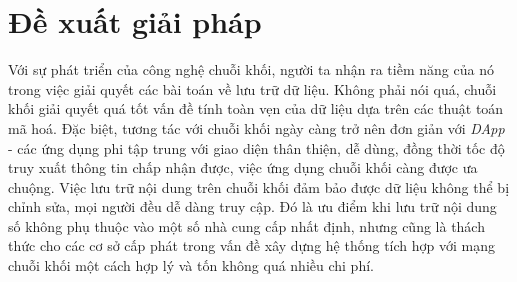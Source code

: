 \section{Đề xuất giải pháp}

Với sự phát triển của công nghệ chuỗi khối, người ta nhận ra tiềm năng của nó trong việc giải quyết các bài toán về lưu trữ dữ liệu. Không phải nói quá, chuỗi khối giải quyết quá tốt vấn đề tính toàn vẹn của dữ liệu dựa trên các thuật toán mã hoá. Đặc biệt, tương tác với chuỗi khối ngày càng trở nên đơn giản với \textit{DApp} - các ứng dụng phi tập trung với giao diện thân thiện, dễ dùng, đồng thời tốc độ truy xuất thông tin chấp nhận được, việc ứng dụng chuỗi khối càng được ưa chuộng. Việc lưu trữ nội dung trên chuỗi khối đảm bảo được dữ liệu không thể bị chỉnh sửa, mọi người đều dễ dàng truy cập. Đó là ưu điểm khi lưu trữ nội dung số không phụ thuộc vào một số nhà cung cấp nhất định, nhưng cũng là thách thức cho các cơ sở cấp phát trong vấn đề xây dựng hệ thống tích hợp với mạng chuỗi khối một cách hợp lý và tốn không quá nhiều chi phí.